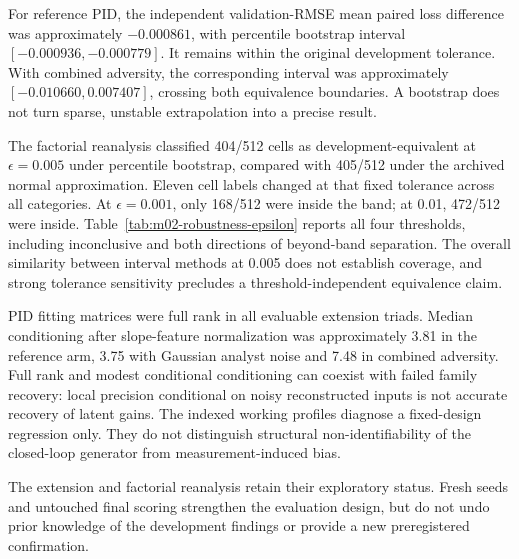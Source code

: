 For reference PID, the independent validation-RMSE mean paired loss difference was approximately $-0.000861$, with percentile bootstrap interval $[-0.000936,-0.000779]$. It remains within the original development tolerance. With combined adversity, the corresponding interval was approximately $[-0.010660,0.007407]$, crossing both equivalence boundaries. A bootstrap does not turn sparse, unstable extrapolation into a precise result.



The factorial reanalysis classified 404/512 cells as development-equivalent at $\epsilon=0.005$ under percentile bootstrap, compared with 405/512 under the archived normal approximation. Eleven cell labels changed at that fixed tolerance across all categories. At $\epsilon=0.001$, only 168/512 were inside the band; at 0.01, 472/512 were inside. Table~\ref{tab:m02-robustness-epsilon} reports all four thresholds, including inconclusive and both directions of beyond-band separation. The overall similarity between interval methods at 0.005 does not establish coverage, and strong tolerance sensitivity precludes a threshold-independent equivalence claim.

PID fitting matrices were full rank in all evaluable extension triads. Median conditioning after slope-feature normalization was approximately 3.81 in the reference arm, 3.75 with Gaussian analyst noise and 7.48 in combined adversity. Full rank and modest conditional conditioning can coexist with failed family recovery: local precision conditional on noisy reconstructed inputs is not accurate recovery of latent gains. The indexed working profiles diagnose a fixed-design regression only. They do not distinguish structural non-identifiability of the closed-loop generator from measurement-induced bias.

The extension and factorial reanalysis retain their exploratory status. Fresh seeds and untouched final scoring strengthen the evaluation design, but do not undo prior knowledge of the development findings or provide a new preregistered confirmation.
